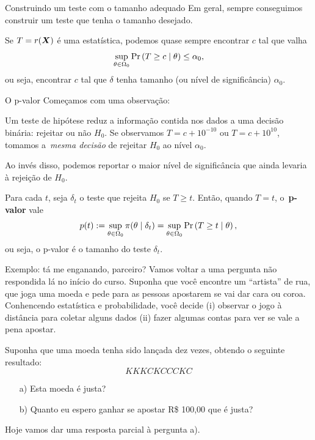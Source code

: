 \begin{frame}{Construindo um teste com o tamanho adequado}
 Em geral, sempre conseguimos construir um teste que tenha o tamanho desejado.
 \begin{obs}
  Se $T = r(\boldsymbol{X})$ é uma estatística, podemos quase sempre encontrar $c$ tal que valha
  \begin{equation}
   \label{eq:size_test_statistic}
   \sup_{\theta \in \Omega_0} \operatorname{Pr}\left(T \geq c \mid \theta \right) \leq \alpha_0,
  \end{equation}
  ou seja, encontrar $c$ tal que $\delta$ tenha tamanho (ou nível de significância) $\alpha_0$.
 \end{obs}
\end{frame}

\begin{frame}{O p-valor}
Começamos com uma observação:
\begin{obs}
 Um teste de hipótese reduz a informação contida nos dados a uma decisão binária: rejeitar ou não $H_0$. 
 Se observamos $T = c + 10^{-10}$ ou $T = c + 10^{10}$, tomamos a~\textit{mesma decisão} de rejeitar $H_0$ ao nível $\alpha_0$.
\end{obs} 
Ao invés disso, podemos reportar o maior nível de significância que ainda levaria à rejeição de $H_0$.
\begin{defn}[O p-valor]
 \label{def:pvalue}
 Para cada $t$, seja $\delta_t$ o teste que rejeita $H_0$ se $T \geq t$.
 Então, quando $T = t$, o~\textbf{p-valor} vale
 \begin{equation}
   p(t) := \sup_{\theta \in \Omega_0} \pi(\theta \mid \delta_t) = \sup_{\theta \in \Omega_0} \operatorname{Pr}\left(T \geq t \mid \theta \right),
 \end{equation}
ou seja, o p-valor é o tamanho do teste $\delta_t$.
\end{defn}
\end{frame}

\begin{frame}{Exemplo: tá me enganando, parceiro?}
Vamos voltar a uma pergunta não respondida lá no início do curso.
Suponha que você encontre um ``artista'' de rua, que joga uma moeda e pede para as pessoas apostarem se vai dar cara ou coroa.
Conhencendo estatística e probabilidade, você decide (i) observar o jogo à distância para coletar alguns dados (ii) fazer algumas contas para ver se vale a pena apostar.
 \begin{pergunta}
 \label{ex:moeda_justa_reborn}
  Suponha que uma moeda tenha sido lançada dez vezes, obtendo o seguinte resultado:
  \begin{equation*}
   KKKCKCCCKC
  \end{equation*}
\begin{itemize}
 \item[a)] Esta moeda é justa?
 \item[b)] Quanto eu espero ganhar se apostar R\$ 100,00 que é justa? 
\end{itemize}
 \end{pergunta}
 Hoje vamos dar uma resposta parcial à pergunta a).
\end{frame}

